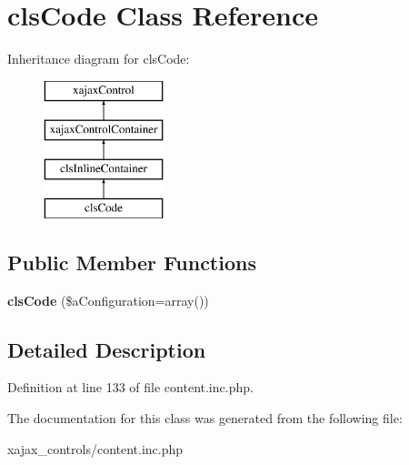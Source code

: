 \hypertarget{classclsCode}{
\section{clsCode Class Reference}
\label{classclsCode}
}
Inheritance diagram for clsCode:\begin{figure}[H]
\begin{center}
\leavevmode
\includegraphics[height=4.000000cm]{classclsCode}
\end{center}
\end{figure}
\subsection*{Public Member Functions}
\begin{DoxyCompactItemize}
\item 
\hypertarget{classclsCode_a27ec002d6027b6fc7f413042ddf63825}{
{\bfseries clsCode} (\$aConfiguration=array())}
\label{classclsCode_a27ec002d6027b6fc7f413042ddf63825}

\end{DoxyCompactItemize}


\subsection{Detailed Description}


Definition at line 133 of file content.inc.php.



The documentation for this class was generated from the following file:\begin{DoxyCompactItemize}
\item 
xajax\_\-controls/content.inc.php\end{DoxyCompactItemize}
